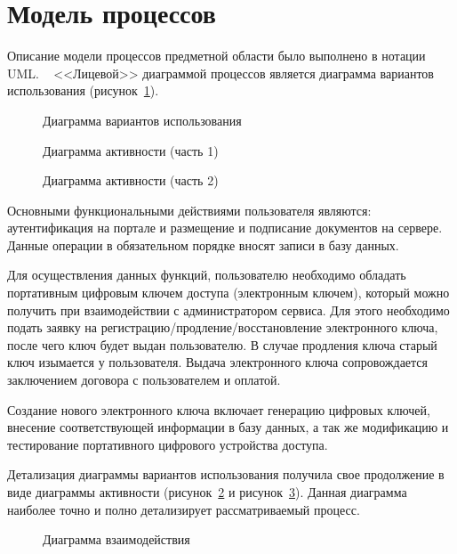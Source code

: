 \section{Модель процессов}

Описание модели процессов предметной области было выполнено в нотации UML.
~\cite{uml_rambo,uml_rosenberg} <<Лицевой>> диаграммой процессов является диаграмма
вариантов использования (рисунок~\ref{ris:3.2.1}).

\begin{figure}[h!]
\center{\texttt{[image: 3-2-1]}}
\caption{Диаграмма вариантов использования}
\label{ris:3.2.1}
\end{figure} 

\begin{figure}[h!]
\center{\texttt{[image: 3-2-2]}}
\caption{Диаграмма активности (часть 1)}
\label{ris:3.2.2}
\end{figure} 

\begin{figure}[pH]
\center{\texttt{[image: 3-2-3]}}
\caption{Диаграмма активности (часть 2)}
\label{ris:3.2.3}
\end{figure} 

Основными функциональными действиями пользователя являются: аутентификация на
портале и размещение и подписание документов на сервере. Данные операции в
обязательном порядке вносят записи в базу данных.

Для осуществления данных функций, пользователю необходимо обладать портативным
цифровым ключем доступа (электронным ключем), который можно получить при
взаимодействии с администратором сервиса. Для этого необходимо подать заявку на
регистрацию/продление/восстановление электронного ключа, после чего ключ будет
выдан пользователю. В случае продления ключа старый ключ изымается у
пользователя. Выдача электронного ключа сопровождается заключением договора с
пользователем и оплатой.

Создание нового электронного ключа включает генерацию цифровых ключей, внесение
соответствующей информации в базу данных, а так же модификацию и тестирование
портативного цифрового устройства доступа.

Детализация диаграммы вариантов использования получила свое продолжение в виде
диаграммы активности (рисунок~\ref{ris:3.2.2} и рисунок~\ref{ris:3.2.3}).
Данная диаграмма наиболее точно и полно детализирует рассматриваемый процесс. 

\begin{figure}[h!]
\center{\texttt{[image: 3-2-4]}}
\caption{Диаграмма взаимодействия}
\label{ris:3.2.4}
\end{figure} 

